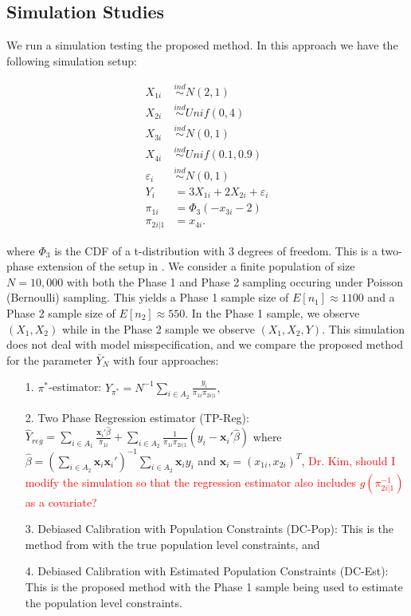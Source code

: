 \documentclass[12pt]{article}
\renewcommand{\bf}[1]{\mathbf{#1}}
\begin{document}
\subsection{Simulation Studies}

We run a simulation testing the proposed method. In this approach we have the
following simulation setup:

$$
\begin{aligned}
X_{1i} &\stackrel{ind}{\sim} N(2, 1) \\
X_{2i} &\stackrel{ind}{\sim} Unif(0, 4) \\
X_{3i} &\stackrel{ind}{\sim} N(0, 1) \\
X_{4i} &\stackrel{ind}{\sim} Unif(0.1, 0.9) \\
\varepsilon_i &\stackrel{ind}{\sim} N(0, 1) \\
Y_{i} &= 3 X_{1i} + 2 X_{2i} + \varepsilon_i \\
\pi_{1i} &= \Phi_3(-x_{3i} - 2) \\
\pi_{2i|1} &= x_{4i}.
\end{aligned}
$$

where $\Phi_3$ is the CDF of a t-distribution with 3 degrees of freedom.
This is a two-phase extension of the setup in \cite{kwon2024debiased}. We
consider a finite population of size $N = 10,000$ with both the Phase 1 and
Phase 2 sampling occuring under Poisson (Bernoulli) sampling. This yields a
Phase 1 sample
size of $E[n_1] \approx 1100$ and a Phase 2 sample size of
$E[n_2] \approx 550$. In the Phase 1 sample, we observe 
$(X_1, X_2)$ while in the Phase 2 sample we observe $(X_1, X_2, Y)$. This
simulation does not deal with model misspecification, and we compare the
proposed method for the parameter $\bar Y_N$ with four approaches:

\begin{itemize}
  \item[1.] $\pi^*$-estimator: $\hat Y_{\pi^*} = N^{-1} \sum_{i \in A_2}
    \frac{y_i}{\pi_{1i} \pi_{2i|1}},$
  \item[2.] Two Phase Regression estimator (TP-Reg): 
    $\hat Y_{reg} = \sum_{i \in A_1} \frac{\bf x_i' \hat \beta}{\pi_{1i}} + 
    \sum_{i \in A_2} \frac{1}{\pi_{1i}\pi_{2i|1}}(y_i - \bf x_i' \hat \beta)$ 
    where $\hat \beta = 
    \left(\sum_{i \in A_2} \bf x_i \bf x_i'\right)^{-1} \sum_{i \in A_2} \bf x_i y_i$
    and $\bf x_i = (x_{1i}, x_{2i})^T$,
    \textcolor{red}{Dr. Kim, should I modify the simulation so that the
    regression estimator also includes $g(\pi_{2i|1}^{-1})$ as a covariate?}
  \item[3.] Debiased Calibration with Population Constraints (DC-Pop): This is
    the method from \cite{kwon2024debiased} with the true population level
    constraints, and 
  \item[4.] Debiased Calibration with Estimated Population Constraints (DC-Est):
    This is the proposed method with the Phase 1 sample being used to estimate
    the population level constraints.
\end{itemize}
\end{document}
